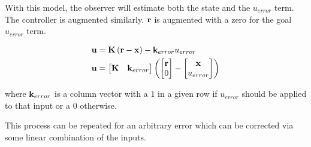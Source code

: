 With this \gls{model}, the \gls{observer} will estimate both the \gls{state} and
the $u_{error}$ term. The controller is augmented similarly. $\mathbf{r}$ is
augmented with a zero for the goal $u_{error}$ term.

\begin{align*}
  \mathbf{u} &= \mathbf{K} \left(\mathbf{r} - \mathbf{x}\right) - \mathbf{k}_{error}u_{error}
    \\
  \mathbf{u} &=
  \begin{bmatrix}
    \mathbf{K} & \mathbf{k}_{error}
  \end{bmatrix}
  \left(\begin{bmatrix}
    \mathbf{r} \\
    0
  \end{bmatrix} -
  \begin{bmatrix}
    \mathbf{x} \\
    u_{error}
  \end{bmatrix}\right)
\end{align*}

where $\mathbf{k}_{error}$ is a column vector with a $1$ in a given row if
$u_{error}$ should be applied to that \gls{input} or a $0$ otherwise.

This process can be repeated for an arbitrary \gls{error} which can be corrected
via some linear combination of the \glspl{input}.
